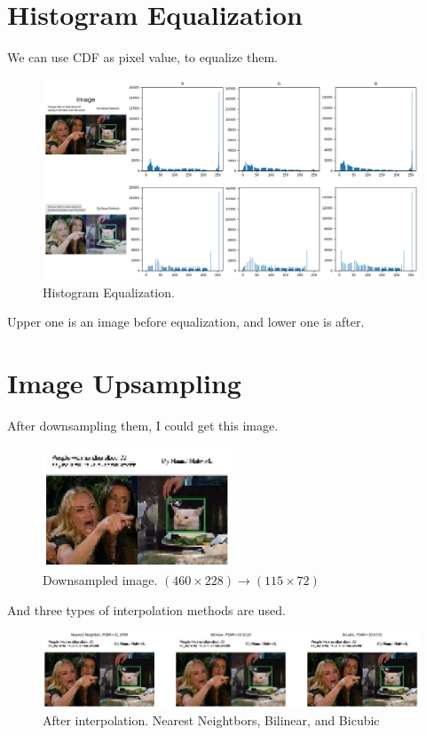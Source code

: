 \documentclass{article}
\begin{document}
\newpage
\section{Histogram Equalization}
We can use CDF as pixel value, to equalize them.
\begin{figure}[!ht]
    \centering
    \includegraphics[width=\textwidth]{fig/hist_equalization.png}
    \caption{Histogram Equalization.}
\end{figure}

Upper one is an image before equalization, and lower one is after.

\newpage
\section{Image Upsampling}
After downsampling them, I could get this image.
\begin{figure}[!ht]
    \centering
    \includegraphics[width=0.5\textwidth]{fig/downsampled.png}
    \caption{Downsampled image. $(460\times 228) \rightarrow (115\times 72)$}
\end{figure}

And three types of interpolation methods are used.
\begin{figure}[!ht]
    \centering
    \includegraphics[width=\textwidth]{fig/interpolation.png}
    \caption{After interpolation. Nearest Neightbors, Bilinear, and Bicubic}
\end{figure}
\end{document}
